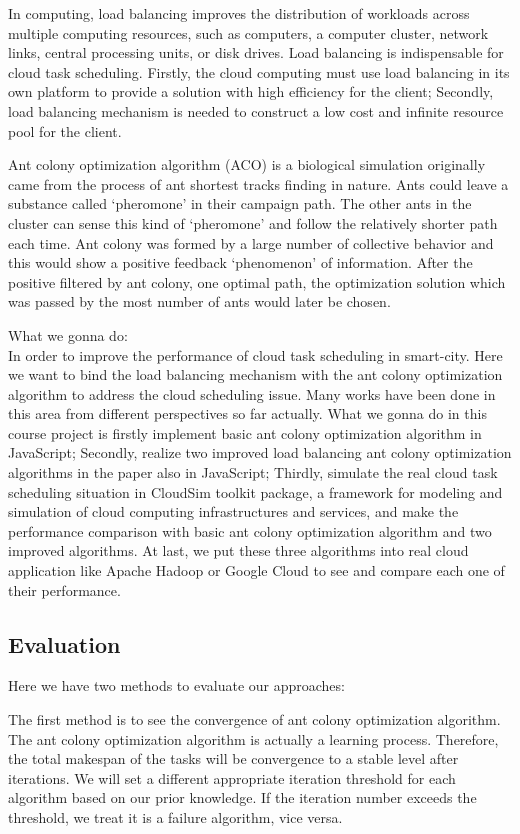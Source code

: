 \documentclass[conference]{IEEEtran}
\begin{document}
In computing, load balancing improves the distribution of workloads across multiple computing resources, such as computers, a computer cluster, network links, central processing units, or disk drives\cite{b4}. Load balancing is indispensable for cloud task scheduling. Firstly, the cloud computing must use load balancing in its own platform to provide a solution with high efficiency for the client; Secondly, load balancing mechanism is needed to construct a low cost and infinite resource pool for the client.

Ant colony optimization algorithm (ACO) is a biological simulation originally came from the process of ant shortest tracks finding in nature. Ants could leave a substance called ‘pheromone’ in their campaign path. The other ants in the cluster can sense this kind of ‘pheromone’ and follow the relatively shorter path each time. Ant colony was formed by a large number of collective behavior and this would show a positive feedback ‘phenomenon’ of information. After the positive filtered by ant colony, one optimal path, the optimization solution which was passed by the most number of ants would later be chosen.

What we gonna do: 
\\In order to improve the performance of cloud task scheduling in smart-city. Here we want to bind the load balancing mechanism with the ant colony optimization algorithm to address the cloud scheduling issue. Many works have been done in this area from different perspectives so far actually. What we gonna  do in this course project is firstly implement basic ant colony optimization algorithm\cite{b5} in JavaScript; Secondly, realize two improved load balancing ant colony optimization algorithms in the paper\cite{b6}\cite{b7} also in JavaScript; Thirdly, simulate the real cloud task scheduling situation in CloudSim toolkit package, a framework for modeling and simulation of cloud computing infrastructures and services, and make the performance comparison with basic ant colony optimization algorithm and two improved algorithms. At last, we put these three algorithms into real cloud application like Apache Hadoop or Google Cloud to see and compare each one of their performance.
\subsection{Evaluation}
Here we have two methods to evaluate our approaches:

The first method is to see the convergence of ant colony optimization algorithm. The ant colony optimization algorithm is actually a learning process. Therefore, the total makespan of the tasks will be convergence to a stable level after iterations. We will set a different appropriate iteration threshold for each algorithm based on our prior knowledge. If the iteration number exceeds the threshold, we treat it is a failure algorithm, vice versa.
\end{document}
